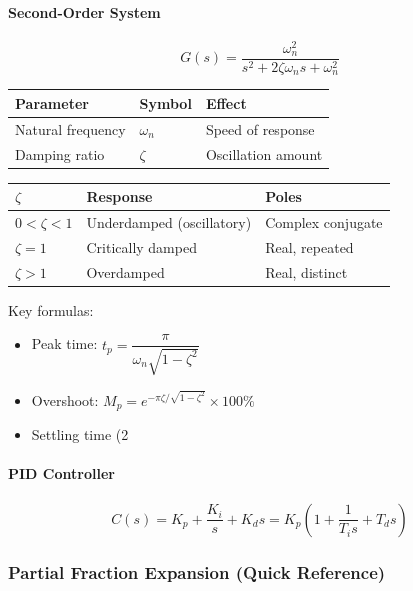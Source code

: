 \documentclass[11pt,a4paper]{book}
\begin{document}
\paragraph{Second-Order System}

\[G(s) = \frac{\omega_n^2}{s^2 + 2\zeta\omega_n s + \omega_n^2}\]

\begin{center}
\begin{tabular}{|l|l|l|}
\hline
Parameter & Symbol & Effect \\
\hline
Natural frequency & $\omega_n$ & Speed of response \\
Damping ratio & $\zeta$ & Oscillation amount \\
\hline
\end{tabular}
\end{center}

\begin{center}
\begin{tabular}{|l|l|l|}
\hline
$\zeta$ & Response & Poles \\
\hline
$0 < \zeta < 1$ & Underdamped (oscillatory) & Complex conjugate \\
$\zeta = 1$ & Critically damped & Real, repeated \\
$\zeta > 1$ & Overdamped & Real, distinct \\
\hline
\end{tabular}
\end{center}

Key formulas:
\begin{itemize}
\item Peak time: $t_p = \dfrac{\pi}{\omega_n\sqrt{1-\zeta^2}}$
\item Overshoot: $M_p = e^{-\pi\zeta/\sqrt{1-\zeta^2}} \times 100\%$
\item Settling time (2%
\end{itemize}

\paragraph{PID Controller}

\[C(s) = K_p + \frac{K_i}{s} + K_d s = K_p\left(1 + \frac{1}{T_i s} + T_d s\right)\]

\medskip\noindent\hrulefill\medskip

\subsubsection{Partial Fraction Expansion (Quick Reference)}
\end{document}
